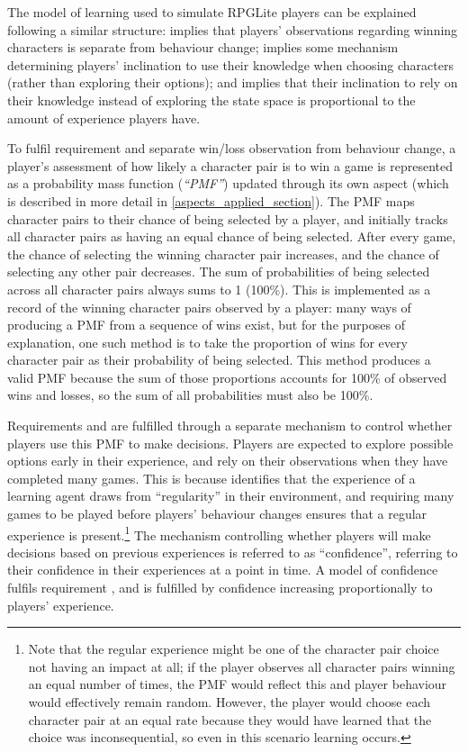 The model of learning used to simulate RPGLite players can be explained
following a similar structure:  implies that players' observations
regarding winning characters is separate from behaviour change;  implies
some mechanism determining players' inclination to use their knowledge when choosing
characters (rather than exploring their options); and  implies that
their inclination to rely on their knowledge instead of exploring the state
space is proportional to the amount of experience players have.

To fulfil requirement  and separate win/loss observation from
behaviour change, a player's assessment of how likely a character pair is to win
a game is represented as a probability mass function (\emph{``PMF''}) updated
through its own aspect (which is described in more detail in
\cref{aspects_applied_section}). The PMF maps character pairs to their chance of
being selected by a player, and initially tracks all character pairs as having
an equal chance of being selected. After every game, the chance of selecting the
winning character pair increases, and the chance of selecting any other pair
decreases. The sum of probabilities of being selected across all character pairs
always sums to 1 (100\%). This is implemented as a record of the winning
character pairs observed by a player: many ways of producing a PMF from a
sequence of wins exist, but for the purposes of explanation, one such method is
to take the proportion of wins for every character pair as their probability of
being selected. This method produces a valid PMF because the sum of those
proportions accounts for 100\% of observed wins and losses, so the sum of all
probabilities must also be 100\%.

Requirements  and  are fulfilled through a separate
mechanism to control whether players use this PMF to make decisions. Players are
expected to explore possible options early in their experience, and rely on
their observations when they have completed many games. This is because
\citet{lachman1997learning} identifies that the experience of a learning agent
draws from ``regularity'' in their environment, and requiring many games to be
played before players' behaviour changes ensures that a regular experience is
present.\footnote{Note that the regular experience might be one of the character
pair choice not having an impact at all; if the player observes all character
pairs winning an equal number of times, the PMF would reflect this and player
behaviour would effectively remain random. However, the player would choose each
character pair at an equal rate because they would have learned that the choice
was inconsequential, so even in this scenario learning occurs.} The mechanism
controlling whether players will make decisions based on previous experiences is
referred to as ``confidence'', referring to their confidence in their experiences at a
point in time. A model of confidence fulfils requirement , and
 is fulfilled by confidence increasing proportionally to players'
experience.


